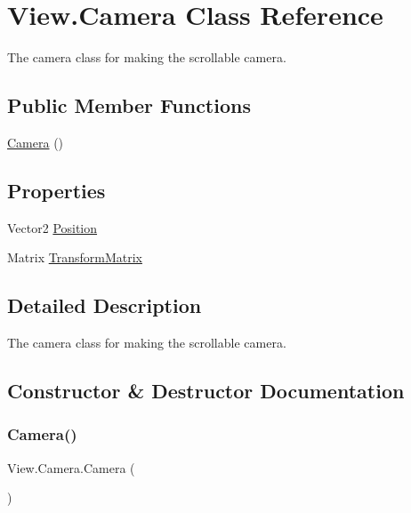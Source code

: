 \hypertarget{class_view_1_1_camera}{}\section{View.\+Camera Class Reference}
\label{class_view_1_1_camera}


The camera class for making the scrollable camera.  


\subsection*{Public Member Functions}
\begin{DoxyCompactItemize}
\item 
\hyperlink{class_view_1_1_camera_a9493580e7485519c5dd9bd496b83165c}{Camera} ()
\end{DoxyCompactItemize}
\subsection*{Properties}
\begin{DoxyCompactItemize}
\item 
Vector2 \hyperlink{class_view_1_1_camera_aafc05b32a065447351d219867908fd88}{Position}
\item 
Matrix \hyperlink{class_view_1_1_camera_a991c3ad145e3f813a9246284f92e3afd}{Transform\+Matrix}
\end{DoxyCompactItemize}


\subsection{Detailed Description}
The camera class for making the scrollable camera. 



\subsection{Constructor \& Destructor Documentation}
\hypertarget{class_view_1_1_camera_a9493580e7485519c5dd9bd496b83165c}{}\label{class_view_1_1_camera_a9493580e7485519c5dd9bd496b83165c} 
\subsubsection{\texorpdfstring{Camera()}{Camera()}}
{\footnotesize\ttfamily View.\+Camera.\+Camera (\begin{DoxyParamCaption}{ }\end{DoxyParamCaption})\hspace{0.3cm}{\ttfamily [inline]}}

